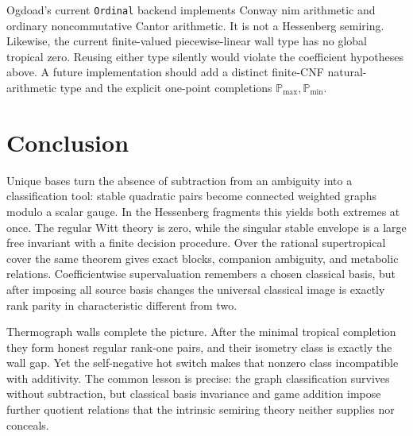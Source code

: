 \documentclass[11pt]{article}
\theoremstyle{definition}
\theoremstyle{remark}
\begin{document}
Ogdoad's current \texttt{Ordinal} backend implements Conway nim arithmetic
and ordinary noncommutative Cantor arithmetic.  It is not a Hessenberg
semiring.  Likewise, the current finite-valued piecewise-linear wall type has
no global tropical zero.  Reusing either type silently would violate the
coefficient hypotheses above.  A future implementation should add a distinct
finite-CNF natural-arithmetic type and the explicit one-point completions
\(\mathbb P_{\max},\mathbb P_{\min}\).

\section{Conclusion}

Unique bases turn the absence of subtraction from an ambiguity into a
classification tool: stable quadratic pairs become connected weighted graphs
modulo a scalar gauge.  In the Hessenberg fragments this yields both extremes
at once.  The regular Witt theory is zero, while the singular stable envelope
is a large free invariant with a finite decision procedure.  Over the rational
supertropical cover the same theorem gives exact blocks, companion ambiguity,
and metabolic relations.  Coefficientwise supervaluation remembers a chosen
classical basis, but after imposing all source basis changes the universal
classical image is exactly rank parity in characteristic different from two.

Thermograph walls complete the picture.  After the minimal tropical
completion they form honest regular rank-one pairs, and their isometry class
is exactly the wall gap.  Yet the self-negative hot switch makes that nonzero
class incompatible with additivity.  The common lesson is precise: the graph
classification survives without subtraction, but classical basis invariance
and game addition impose further quotient relations that the intrinsic
semiring theory neither supplies nor conceals.



\end{document}
